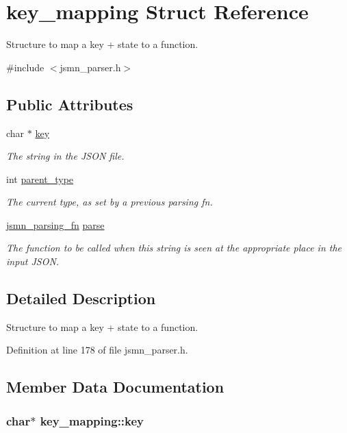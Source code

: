 \hypertarget{structkey__mapping}{\section{key\-\_\-mapping Struct Reference}
\label{structkey__mapping}
}


Structure to map a key + state to a function.  




{\ttfamily \#include $<$jsmn\-\_\-parser.\-h$>$}

\subsection*{Public Attributes}
\begin{DoxyCompactItemize}
\item 
char $\ast$ \hyperlink{structkey__mapping_a900fa61797216c8fbffd042cd12f4e62}{key}
\begin{DoxyCompactList}\small\item\em The string in the J\-S\-O\-N file. \end{DoxyCompactList}\item 
int \hyperlink{structkey__mapping_ae5ee4a8838ac3c188143edb081e78207}{parent\-\_\-type}
\begin{DoxyCompactList}\small\item\em The current type, as set by a previous parsing fn. \end{DoxyCompactList}\item 
\hyperlink{jsmn__parser_8h_a21c1272bc8a1fb518bd46118b824870f}{jsmn\-\_\-parsing\-\_\-fn} \hyperlink{structkey__mapping_a5aaab47c145def7d5d253d8e3309b993}{parse}
\begin{DoxyCompactList}\small\item\em The function to be called when this string is seen at the appropriate place in the input J\-S\-O\-N. \end{DoxyCompactList}\end{DoxyCompactItemize}


\subsection{Detailed Description}
Structure to map a key + state to a function. 

Definition at line 178 of file jsmn\-\_\-parser.\-h.



\subsection{Member Data Documentation}
\hypertarget{structkey__mapping_a900fa61797216c8fbffd042cd12f4e62}{
\subsubsection[{key}]{\setlength{\rightskip}{0pt plus 5cm}char$\ast$ key\-\_\-mapping\-::key}}\label{structkey__mapping_a900fa61797216c8fbffd042cd12f4e62}


